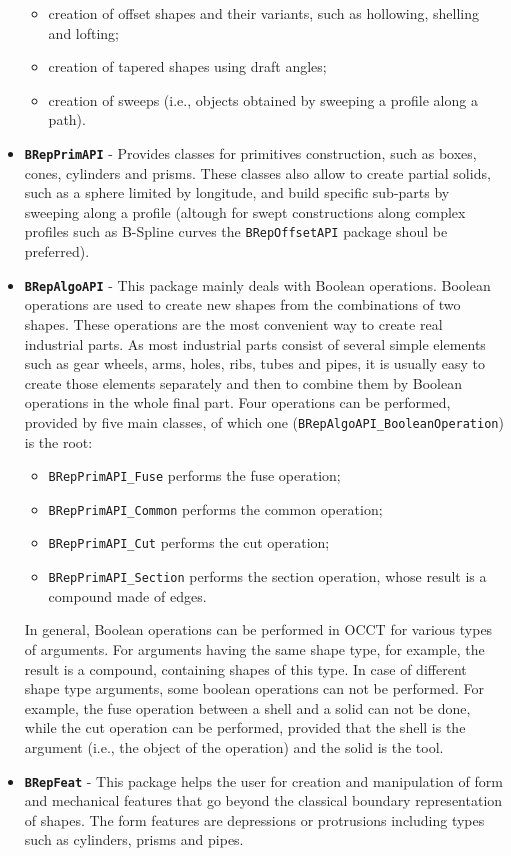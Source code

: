\begin{itemize}
\begin{itemize}
	\item creation of offset shapes and their variants, such as hollowing, shelling and lofting;
	\item creation of tapered shapes using draft angles;
	\item creation of sweeps (i.e., objects obtained by sweeping a profile along a path).
	\end{itemize}
\item \textbf{\lstinline[language=Java]!BRepPrimAPI!} - Provides classes for primitives construction, such as boxes, cones, cylinders and prisms. These classes also allow to create partial solids, such as a sphere limited by longitude, and build specific sub-parts by sweeping along a profile (altough for swept constructions along complex profiles such as B-Spline curves the \lstinline[language=Java]!BRepOffsetAPI! package shoul be preferred).
\item \textbf{\lstinline[language=Java]!BRepAlgoAPI!} - This package mainly deals with Boolean operations. Boolean operations are used to create new shapes from the combinations of two shapes. These operations are the most convenient way to create real industrial parts. As most industrial parts consist of several simple elements such as gear wheels, arms, holes, ribs, tubes and pipes, it is usually easy to create those elements separately and then to combine them by Boolean operations in the whole final part. Four operations can be performed, provided by five main classes, of which one (\lstinline[language=Java]!BRepAlgoAPI_BooleanOperation!) is the root:
	\begin{itemize}
	\item \lstinline[language=Java]!BRepPrimAPI_Fuse! performs the fuse operation;
	\item \lstinline[language=Java]!BRepPrimAPI_Common! performs the common operation;
	\item \lstinline[language=Java]!BRepPrimAPI_Cut! performs the cut operation;
	\item \lstinline[language=Java]!BRepPrimAPI_Section! performs the section operation, whose result is a compound made of edges.
	\end{itemize}
In general, Boolean operations can be performed in \gls{OCCT} for various types of arguments. For arguments having the same shape type, for example, the result is a compound, containing shapes of this type. In case of different shape type arguments, some boolean operations can not be performed. For example, the fuse operation between a shell and a solid can not be done, while the cut operation can be performed, provided that the shell is the argument (i.e., the object of the operation) and the solid is the tool.
\item \textbf{\lstinline[language=Java]!BRepFeat!} - This package helps the user for creation and manipulation of form and mechanical features that go beyond the classical boundary representation of shapes. The form features are depressions or protrusions including types such as cylinders, prisms and pipes.
\end{itemize}

